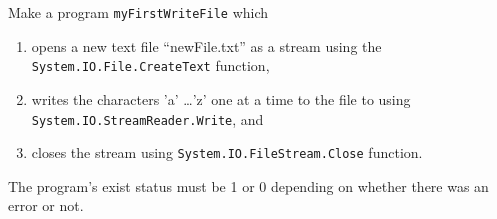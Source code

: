 Make a program \lstinline{myFirstWriteFile} which
\begin{enumerate}
\item opens a new text file ``newFile.txt'' as a stream using the
  \lstinline{System.IO.File.CreateText} function,
\item writes the characters 'a' \dots 'z' one at a time to the file to using
  \lstinline{System.IO.StreamReader.Write}, and
\item closes the stream using \lstinline{System.IO.FileStream.Close}
  function.
\end{enumerate}
The program's exist status must be 1 or 0 depending on whether there
was an error or not.
